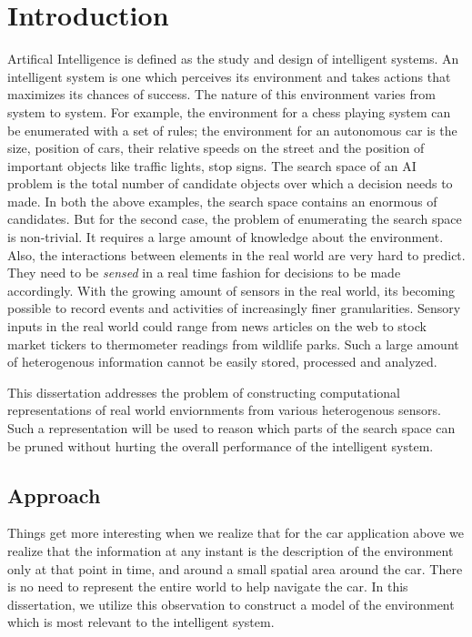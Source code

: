 \chapter{Introduction}

Artifical Intelligence is defined as the study and design of intelligent systems. An intelligent system is one which perceives its environment and takes actions that maximizes its chances of success. The nature of this environment varies from system to system. For example, the environment for a chess playing system can be enumerated with a set of rules; the environment for an autonomous car is the size, position of cars, their relative speeds on the street and the position of important objects like traffic lights, stop signs. The search space of an AI problem is the total number of candidate objects over which a decision needs to made. In both the above examples, the search space contains an enormous of candidates. But for the second case, the problem of enumerating the search space is non-trivial. It requires a large amount of knowledge about the environment. Also, the interactions between elements in the real world are very hard to predict. They need to be \textit{sensed} in a real time fashion for decisions to be made accordingly. With the growing amount of sensors in the real world, its becoming possible to record events and activities of increasingly finer granularities. Sensory inputs in the real world could range from news articles on the web to stock market tickers to thermometer readings from wildlife parks. Such a large amount of heterogenous information cannot be easily stored, processed and analyzed. 

This dissertation addresses the problem of constructing computational representations of real world enviornments from various heterogenous sensors. Such a representation will be used to reason which parts of the search space can be pruned without hurting the overall performance of the intelligent system.

\section{Approach}
Things get more interesting when we realize that for the car application above we realize that the information at any instant is the description of the environment only at that point in time, and around a small spatial area around the car. There is no need to represent the entire world to help navigate the car. In this dissertation, we utilize this observation to construct a model of the environment which is most relevant to the intelligent system.

